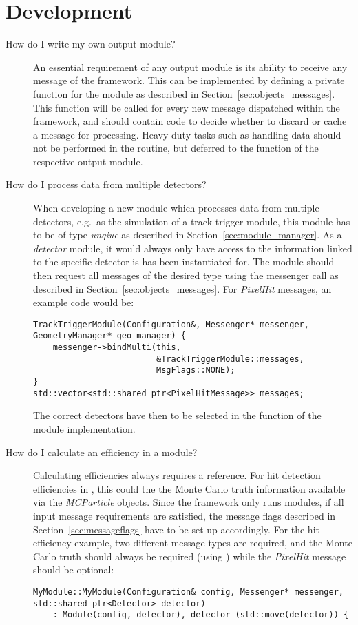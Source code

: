 \section{Development}
\begin{description}
\item[How do I write my own output module?]
An essential requirement of any output module is its ability to receive any message of the framework.
This can be implemented by defining a private  function for the module as described in Section~\ref{sec:objects_messages}.
This function will be called for every new message dispatched within the framework, and should contain code to decide whether to discard or cache a message for processing.
Heavy-duty tasks such as handling data should not be performed in the  routine, but deferred to the  function of the respective output module.

\item[How do I process data from multiple detectors?]
When developing a new \apsq module which processes data from multiple detectors, e.g.\ as the simulation of a track trigger module, this module has to be of type \emph{unqiue} as described in Section~\ref{sec:module_manager}.
As a \emph{detector} module, it would always only have access to the information linked to the specific detector is has been instantiated for.
The module should then request all messages of the desired type using the messenger call  as described in Section~\ref{sec:objects_messages}.
For \emph{PixelHit} messages, an example code would be:

\begin{verbatim}
TrackTriggerModule(Configuration&, Messenger* messenger, GeometryManager* geo_manager) {
    messenger->bindMulti(this,
                         &TrackTriggerModule::messages,
                         MsgFlags::NONE);
}
std::vector<std::shared_ptr<PixelHitMessage>> messages;
\end{verbatim}
The correct detectors have then to be selected in the  function of the module implementation.
\item[How do I calculate an efficiency in a module?]
Calculating efficiencies always requires a reference.
For hit detection efficiencies in \apsq, this could the the Monte Carlo truth information available via the \emph{MCParticle} objects.
Since the framework only runs modules, if all input message requirements are satisfied, the message flags described in Section~\ref{sec:messageflags} have to be set up accordingly.
For the hit efficiency example, two different message types are required, and the Monte Carlo truth should always be required (using ) while the \emph{PixelHit} message should be optional:
\begin{verbatim}
MyModule::MyModule(Configuration& config, Messenger* messenger, std::shared_ptr<Detector> detector)
    : Module(config, detector), detector_(std::move(detector)) {


\end{verbatim}
\end{description}
